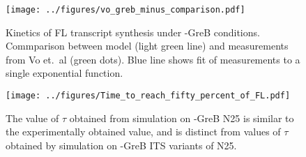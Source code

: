 \begin{figure}
    \begin{center}
        \texttt{[image: ../figures/vo\_greb\_minus\_comparison.pdf]}
    \end{center}
    \caption{Kinetics of FL transcript synthesis under -GreB conditions.
      Commparison between model (light green line) and measurements from Vo
      et.\ al \cite{vo_vitro_2003-1} (green dots). Blue line shows fit of
      measurements to a single exponential function.}
\label{fig:vo_comparison}
\end{figure}


\begin{figure}
    \begin{center}
      \texttt{[image: ../figures/Time\_to\_reach\_fifty\_percent\_of\_FL.pdf]}
    \end{center}
    \caption{The value of $\tau$ obtained from simulation on -GreB N25 is
      similar to the experimentally obtained value, and is distinct from
      values of $\tau$ obtained by simulation on -GreB ITS variants of N25.}
\label{fig:its_variant_fl_comparison}
\end{figure}



